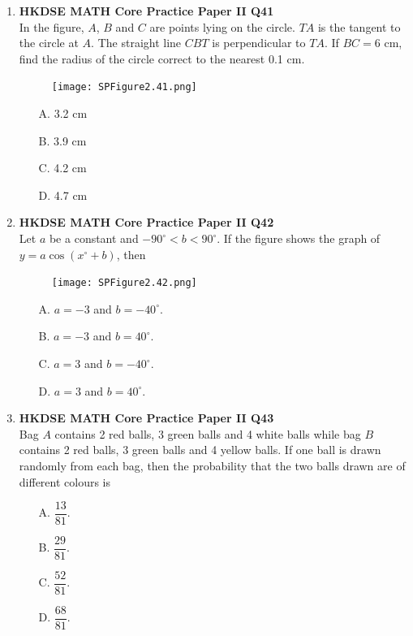 \documentclass[12pt]{article}
\begin{document}
\begin{enumerate}
	\item \textbf{HKDSE MATH Core Practice Paper II Q41}\\
	In the figure, $A$, $B$ and $C$ are points lying on the circle. $TA$ is the tangent to the circle at $A$. The straight line $CBT$ is perpendicular to $TA$. If $BC = 6$ cm, find the radius of the circle correct to the nearest 0.1 cm.
	\begin{figure}[H]
		\centering
		\texttt{[image: SPFigure2.41.png]}	
	\end{figure}
	\begin{enumerate}
		\item[A.] 3.2 cm
		\item[B.] 3.9 cm
		\item[C.] 4.2 cm
		\item[D.] 4.7 cm
	\end{enumerate}
	
	\item \textbf{HKDSE MATH Core Practice Paper II Q42}\\
	Let $a$ be a constant and $-90^\circ < b < 90^\circ$. If the figure shows the graph of $y = a\cos{(x^\circ + b)}$, then 
	\begin{figure}[H]
		\centering
		\texttt{[image: SPFigure2.42.png]}	
	\end{figure}
	\begin{enumerate}
		\item[A.] $a = -3$ and $b = -40^\circ$.
		\item[B.] $a = -3$ and $b = 40^\circ$.
		\item[C.] $a = 3$ and $b = -40^\circ$.
		\item[D.] $a = 3$ and $b = 40^\circ$.
	\end{enumerate}
	
	\item \textbf{HKDSE MATH Core Practice Paper II Q43}\\
	Bag $A$ contains 2 red balls, 3 green balls and 4 white balls while bag $B$ contains 2 red balls, 3 green balls and 4 yellow balls. If one ball is drawn randomly from each bag, then the probability that the two balls drawn are of different colours is
	\begin{enumerate}
		\item[A.] $\dfrac{13}{81}$.
		\item[B.] $\dfrac{29}{81}$.
		\item[C.] $\dfrac{52}{81}$.
		\item[D.] $\dfrac{68}{81}$.
	\end{enumerate}
	

\end{enumerate}
\end{document}
